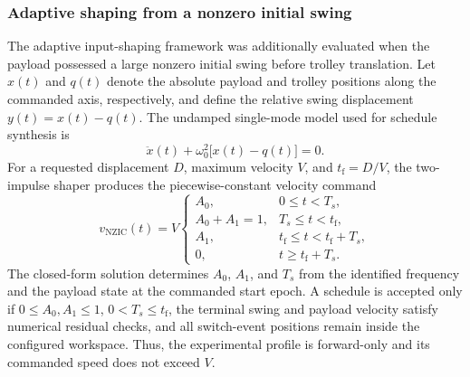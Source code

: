 
\subsubsection{Adaptive shaping from a nonzero initial swing}
\label{sec:exp_nonzero_ic}

The adaptive input-shaping framework was additionally evaluated when the
payload possessed a large nonzero initial swing before trolley translation.
Let $x(t)$ and $q(t)$ denote the absolute payload and trolley positions along
the commanded axis, respectively, and define the relative swing displacement
$y(t)=x(t)-q(t)$.  The undamped single-mode model used for schedule synthesis
is
\begin{equation}
    \ddot{x}(t)+\omega_0^2\bigl[x(t)-q(t)\bigr]=0.
    \label{eq:nzic_model}
\end{equation}
For a requested displacement $D$, maximum velocity $V$, and
$t_{\mathrm f}=D/V$, the two-impulse shaper produces the piecewise-constant
velocity command
\begin{equation}
v_{\mathrm{NZIC}}(t)=V
\begin{cases}
A_0, & 0\leq t<T_s,\\
A_0+A_1=1, & T_s\leq t<t_{\mathrm f},\\
A_1, & t_{\mathrm f}\leq t<t_{\mathrm f}+T_s,\\
0, & t\geq t_{\mathrm f}+T_s.
\end{cases}
\label{eq:nzic_velocity}
\end{equation}
The closed-form solution determines $A_0$, $A_1$, and $T_s$ from the
identified frequency and the payload state at the commanded start epoch.  A
schedule is accepted only if $0\leq A_0,A_1\leq1$, $0<T_s\leq t_{\mathrm f}$,
the terminal swing and payload velocity satisfy numerical residual checks, and
all switch-event positions remain inside the configured workspace.  Thus, the
experimental profile is forward-only and its commanded speed does not exceed
$V$.

